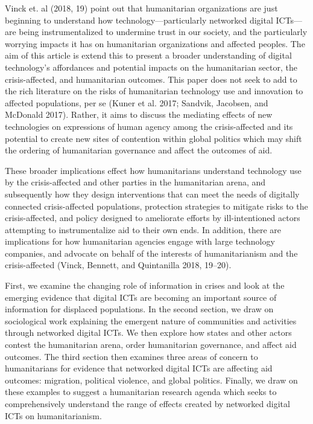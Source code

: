 Vinck et. al (2018, 19) point out that humanitarian organizations are
just beginning to understand how technology---particularly networked
digital ICTs---are being instrumentalized to undermine trust in our
society, and the particularly worrying impacts it has on humanitarian
organizations and affected peoples. The aim of this article is extend
this to present a broader understanding of digital technology's
affordances and potential impacts on the humanitarian sector, the
crisis-affected, and humanitarian outcomes. This paper does not seek to
add to the rich literature on the risks of humanitarian technology use
and innovation to affected populations, per se (Kuner et al. 2017;
Sandvik, Jacobsen, and McDonald 2017). Rather, it aims to discuss the
mediating effects of new technologies on expressions of human agency
among the crisis-affected and its potential to create new sites of
contention within global politics which may shift the ordering of
humanitarian governance and affect the outcomes of aid.

These broader implications effect how humanitarians understand
technology use by the crisis-affected and other parties in the
humanitarian arena, and subsequently how they design interventions that
can meet the needs of digitally connected crisis-affected populations,
protection strategies to mitigate risks to the crisis-affected, and
policy designed to ameliorate efforts by ill-intentioned actors
attempting to instrumentalize aid to their own ends. In addition, there
are implications for how humanitarian agencies engage with large
technology companies, and advocate on behalf of the interests of
humanitarianism and the crisis-affected (Vinck, Bennett, and Quintanilla
2018, 19--20).

First, we examine the changing role of information in crises and look at
the emerging evidence that digital ICTs are becoming an important source
of information for displaced populations. In the second section, we draw
on sociological work explaining the emergent nature of communities and
activities through networked digital ICTs. We then explore how states
and other actors contest the humanitarian arena, order humanitarian
governance, and affect aid outcomes. The third section then examines
three areas of concern to humanitarians for evidence that networked
digital ICTs are affecting aid outcomes: migration, political violence,
and global politics. Finally, we draw on these examples to suggest a
humanitarian research agenda which seeks to comprehensively understand
the range of effects created by networked digital ICTs on
humanitarianism.

